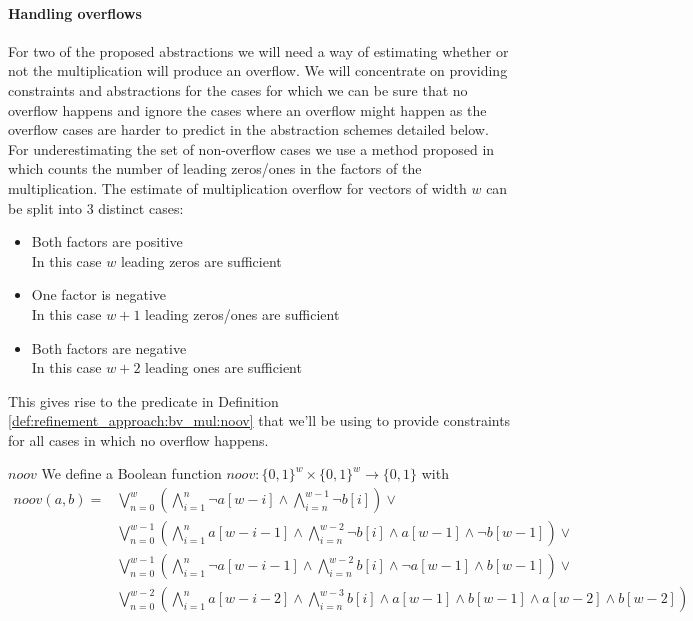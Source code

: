 \paragraph{Handling overflows}
For two of the proposed abstractions we will need a way of estimating whether or not the multiplication will produce an overflow. We will concentrate on providing constraints and abstractions for the cases for which we can be sure that no overflow happens and ignore the cases where an overflow might happen as the overflow cases are harder to predict in the abstraction schemes detailed below. For underestimating the set of non-overflow cases we use a method proposed in \cite[p. 32f]{Warren-HackersDelight} which counts the number of leading zeros/ones in the factors of the multiplication. The estimate of multiplication overflow for vectors of width $w$ can be split into 3 distinct cases:
\begin{itemize}
    \item Both factors are positive\\
    In this case $w$ leading zeros are sufficient
    \item One factor is negative\\
    In this case $w+1$ leading zeros/ones are sufficient
    \item Both factors are negative\\
    In this case $w+2$ leading ones are sufficient
\end{itemize}
This gives rise to the predicate in Definition \ref{def:refinement_approach:bv_mul:noov} that we'll be using to provide constraints for all cases in which no overflow happens.
\begin{definition}{$noov$}
\label{def:refinement_approach:bv_mul:noov}
We define a Boolean function $noov: \{0,1\}^w \times \{0,1\}^w \rightarrow \{0,1\}$ with
\begin{align*}
noov\left(a, b\right)
    = &\bigvee\limits_{n=0}^{w}
        \left(
        \bigwedge\limits_{i=1}^{n} \neg a[w-i]
        \land
        \bigwedge\limits_{i=n}^{w-1} \neg b[i]
        \right) \lor\\
       &\bigvee\limits_{n=0}^{w-1}
        \left(
        \bigwedge\limits_{i=1}^{n} a[w-i-1]
        \land
        \bigwedge\limits_{i=n}^{w-2} \neg b[i]
        \land a[w-1]
        \land \neg b[w-1]
        \right) \lor\\
      &\bigvee\limits_{n=0}^{w-1}
        \left(
        \bigwedge\limits_{i=1}^{n} \neg a[w-i-1]
        \land
        \bigwedge\limits_{i=n}^{w-2} b[i]
        \land \neg a[w-1]
        \land  b[w-1]
        \right) \lor\\
      &\bigvee\limits_{n=0}^{w-2}
        \left(
        \bigwedge\limits_{i=1}^{n} a[w-i-2]
        \land
        \bigwedge\limits_{i=n}^{w-3} b[i]
        \land a[w-1]
        \land b[w-1]
        \land a[w-2]
        \land b[w-2]
        \right)
\end{align*}
\end{definition}
